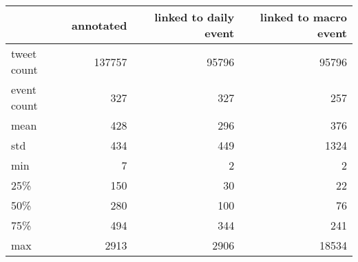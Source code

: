 \begin{tabular}{lrrr}
\hline
{} &  annotated &  linked to daily event &  linked to macro event \\
\hline
tweet count &     137757 &                  95796 &                  95796 \\
event count       &        327 &                    327 &                    257 \\
\hline
mean        &        428 &                    296 &                    376 \\
std         &        434 &                    449 &                   1324 \\
min         &          7 &                      2 &                      2 \\
25\%         &        150 &                     30 &                     22 \\
50\%         &        280 &                    100 &                     76 \\
75\%         &        494 &                    344 &                    241 \\
max         &       2913 &                   2906 &                  18534 \\
\hline
\end{tabular}
